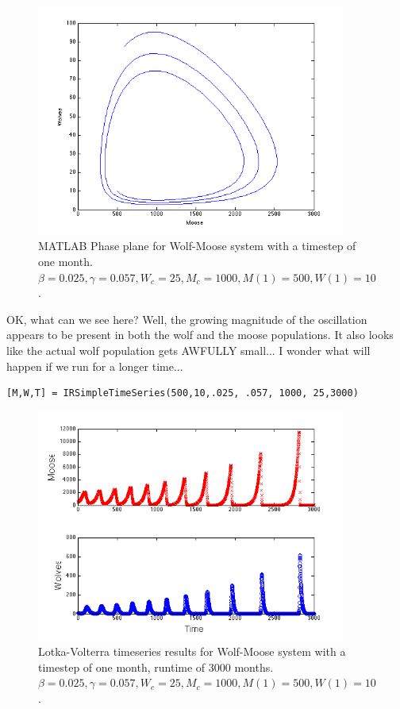 \documentclass{tufte-handout}
\begin{document}
\begin{figure}[h!]
\includegraphics[width=4in]{figs/WolfMooseMATLABPP}
\caption{MATLAB Phase plane for Wolf-Moose system with a timestep of one month.  $\beta = 0.025, \gamma = 0.057, W_c = 25, M_c=1000, M(1) = 500, W(1) = 10$.}
\end{figure}


OK, what can we see here?  Well, the growing magnitude of the oscillation appears to be present in both the wolf and the moose populations.  It also looks like the actual wolf population gets AWFULLY small...  I wonder what will happen if we run for a longer time...

\begin{verbatim}
[M,W,T] = IRSimpleTimeSeries(500,10,.025, .057, 1000, 25,3000)
\end{verbatim}

\begin{figure}[h!]
\includegraphics[width=4in]{figs/StackedWolfMooseTImeSeriesLongTime}
\caption{Lotka-Volterra timeseries results for Wolf-Moose system with a timestep of one month, runtime of 3000 months.  $\beta = 0.025, \gamma = 0.057, W_c = 25, M_c=1000, M(1) = 500, W(1) = 10$.}
\end{figure}
\end{document}
